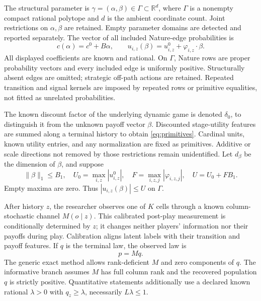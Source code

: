 \documentclass[11pt,a4paper]{article}
\numberwithin{equation}{section}
\theoremstyle{definition}
\newcommand{\R}{\mathbb R}
\begin{document}
The structural parameter is
\(\gamma=(\alpha,\beta)\in\Gamma\subset\R^d\), where \(\Gamma\) is a
nonempty compact rational polytope and \(d\) is the ambient coordinate
count. Joint restrictions on \(\alpha,\beta\) are retained. Empty
parameter domains are detected and reported separately.
The vector of all included Nature-edge probabilities is
\begin{equation}\label{eq:primitives}
 c(\alpha)=c^0+B\alpha,\qquad
 u_{i,z}(\beta)=u^0_{i,z}+\varphi_{i,z}\cdot\beta .
\end{equation}
All displayed coefficients are known and rational. On \(\Gamma\),
Nature rows are proper probability vectors and every included edge
is uniformly positive. Structurally absent edges are omitted; strategic
off-path actions are retained. Repeated transition and signal kernels
are imposed by repeated rows or primitive equalities, not fitted as
unrelated probabilities.

The known discount factor of the underlying dynamic game is denoted
\(\delta_0\), to distinguish it from the unknown payoff vector \(\beta\).
Discounted stage-utility features are summed along a terminal history
to obtain \eqref{eq:primitives}. Cardinal units, known utility entries,
and any normalization are fixed as primitives. Additive or scale
directions not removed by those restrictions remain unidentified.
Let \(d_\beta\) be the dimension of \(\beta\), and suppose
\begin{equation}\label{eq:payoffbounds}
 \|\beta\|_1\le B_1,\quad
 U_0=\max_{i,z}|u^0_{i,z}|,\quad
 F=\max_{i,z,j}|\varphi_{i,z,j}|,\quad U=U_0+FB_1 .
\end{equation}
Empty maxima are zero. Thus \(|u_{i,z}(\beta)|\le U\) on \(\Gamma\).

After history \(z\), the researcher observes one of \(K\) cells through
a known column-stochastic channel \(M(o\mid z)\). This calibrated
post-play measurement is conditionally determined by \(z\); it changes
neither players' information nor their payoffs during play.
Calibration aligns latent labels with their transition and payoff
features. If \(q\) is the terminal law, the observed law is
\begin{equation}\label{eq:channel}p=Mq.\end{equation}
The generic exact method allows rank-deficient \(M\) and zero components
of \(q\). The informative branch assumes \(M\) has full column rank and
the recovered population \(q\) is strictly positive. Quantitative
statements additionally use a declared known rational \(\lambda>0\)
with \(q_z\ge\lambda\), necessarily \(L\lambda\le1\).
\end{document}

